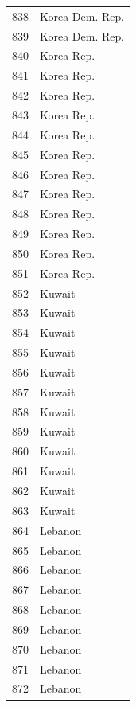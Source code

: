 \documentclass[
  letterpaper,
  DIV=11,
  numbers=noendperiod]{scrreprt}
\begin{document}
\begin{tabular}{ll}
838  &           Korea Dem. Rep. \\
839  &           Korea Dem. Rep. \\
840  &                Korea Rep. \\
841  &                Korea Rep. \\
842  &                Korea Rep. \\
843  &                Korea Rep. \\
844  &                Korea Rep. \\
845  &                Korea Rep. \\
846  &                Korea Rep. \\
847  &                Korea Rep. \\
848  &                Korea Rep. \\
849  &                Korea Rep. \\
850  &                Korea Rep. \\
851  &                Korea Rep. \\
852  &                    Kuwait \\
853  &                    Kuwait \\
854  &                    Kuwait \\
855  &                    Kuwait \\
856  &                    Kuwait \\
857  &                    Kuwait \\
858  &                    Kuwait \\
859  &                    Kuwait \\
860  &                    Kuwait \\
861  &                    Kuwait \\
862  &                    Kuwait \\
863  &                    Kuwait \\
864  &                   Lebanon \\
865  &                   Lebanon \\
866  &                   Lebanon \\
867  &                   Lebanon \\
868  &                   Lebanon \\
869  &                   Lebanon \\
870  &                   Lebanon \\
871  &                   Lebanon \\
872  &                   Lebanon \\

\end{tabular}
\end{document}

